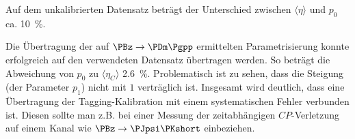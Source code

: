 Auf dem unkalibrierten Datensatz beträgt der Unterschied zwischen $\langle η \rangle$ und $p_0$ ca. \SI{10}{\percent}.

Die Übertragung der auf $\PBz \to \PDm\Pgpp$ ermittelten Parametrisierung konnte erfolgreich auf den verwendeten Datensatz übertragen werden.
So beträgt die Abweichung von $p_0$ zu $\langle η_C \rangle$ \SI{2.6}{\percent}.
Problematisch ist zu sehen, dass die Steigung (der Parameter $p_1$) nicht mit $1$ verträglich ist.
Insgesamt wird deutlich, dass eine Übertragung der Tagging-Kalibration mit einem systematischen Fehler verbunden ist.
Diesen sollte man z.B. bei einer Messung der zeitabhängigen $CP$-Verletzung auf einem Kanal wie $\PBz \to \PJpsi\PKshort$ einbeziehen.

\newpage

